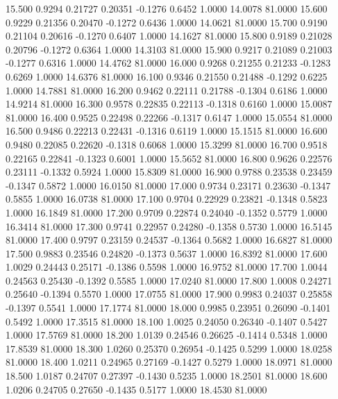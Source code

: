   15.500   0.9294   0.21727   0.20351  -0.1276   0.6452   1.0000  14.0078  81.0000
  15.600   0.9229   0.21356   0.20470  -0.1272   0.6436   1.0000  14.0621  81.0000
  15.700   0.9190   0.21104   0.20616  -0.1270   0.6407   1.0000  14.1627  81.0000
  15.800   0.9189   0.21028   0.20796  -0.1272   0.6364   1.0000  14.3103  81.0000
  15.900   0.9217   0.21089   0.21003  -0.1277   0.6316   1.0000  14.4762  81.0000
  16.000   0.9268   0.21255   0.21233  -0.1283   0.6269   1.0000  14.6376  81.0000
  16.100   0.9346   0.21550   0.21488  -0.1292   0.6225   1.0000  14.7881  81.0000
  16.200   0.9462   0.22111   0.21788  -0.1304   0.6186   1.0000  14.9214  81.0000
  16.300   0.9578   0.22835   0.22113  -0.1318   0.6160   1.0000  15.0087  81.0000
  16.400   0.9525   0.22498   0.22266  -0.1317   0.6147   1.0000  15.0554  81.0000
  16.500   0.9486   0.22213   0.22431  -0.1316   0.6119   1.0000  15.1515  81.0000
  16.600   0.9480   0.22085   0.22620  -0.1318   0.6068   1.0000  15.3299  81.0000
  16.700   0.9518   0.22165   0.22841  -0.1323   0.6001   1.0000  15.5652  81.0000
  16.800   0.9626   0.22576   0.23111  -0.1332   0.5924   1.0000  15.8309  81.0000
  16.900   0.9788   0.23538   0.23459  -0.1347   0.5872   1.0000  16.0150  81.0000
  17.000   0.9734   0.23171   0.23630  -0.1347   0.5855   1.0000  16.0738  81.0000
  17.100   0.9704   0.22929   0.23821  -0.1348   0.5823   1.0000  16.1849  81.0000
  17.200   0.9709   0.22874   0.24040  -0.1352   0.5779   1.0000  16.3414  81.0000
  17.300   0.9741   0.22957   0.24280  -0.1358   0.5730   1.0000  16.5145  81.0000
  17.400   0.9797   0.23159   0.24537  -0.1364   0.5682   1.0000  16.6827  81.0000
  17.500   0.9883   0.23546   0.24820  -0.1373   0.5637   1.0000  16.8392  81.0000
  17.600   1.0029   0.24443   0.25171  -0.1386   0.5598   1.0000  16.9752  81.0000
  17.700   1.0044   0.24563   0.25430  -0.1392   0.5585   1.0000  17.0240  81.0000
  17.800   1.0008   0.24271   0.25640  -0.1394   0.5570   1.0000  17.0755  81.0000
  17.900   0.9983   0.24037   0.25858  -0.1397   0.5541   1.0000  17.1774  81.0000
  18.000   0.9985   0.23951   0.26090  -0.1401   0.5492   1.0000  17.3515  81.0000
  18.100   1.0025   0.24050   0.26340  -0.1407   0.5427   1.0000  17.5769  81.0000
  18.200   1.0139   0.24546   0.26625  -0.1414   0.5348   1.0000  17.8539  81.0000
  18.300   1.0260   0.25370   0.26954  -0.1425   0.5299   1.0000  18.0258  81.0000
  18.400   1.0211   0.24965   0.27169  -0.1427   0.5279   1.0000  18.0971  81.0000
  18.500   1.0187   0.24707   0.27397  -0.1430   0.5235   1.0000  18.2501  81.0000
  18.600   1.0206   0.24705   0.27650  -0.1435   0.5177   1.0000  18.4530  81.0000
